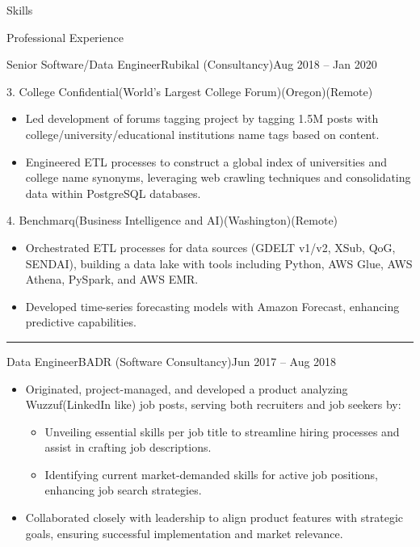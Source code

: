 \documentclass[]{ahmedamrcv}
\begin{document}
\begin{cvsection}{Skills}
\begin{cvsection}{Professional Experience}
\begin{cvsubsection}{Senior Software/Data Engineer}{Rubikal (Consultancy)}{Aug 2018 -- Jan 2020}
		\begin{cvsubsection}{3. College Confidential}{(World's Largest College Forum)}{(Oregon)(Remote)}	
			\begin{itemize}
				\item Led development of forums tagging project by tagging 1.5M posts with college/university/educational institutions name tags based on content.
                    \item Engineered ETL processes to construct a global index of universities and college name synonyms, leveraging web crawling techniques and consolidating data within PostgreSQL databases.
			\end{itemize}
		\end{cvsubsection}

		\begin{cvsubsection}{4. Benchmarq}{(Business Intelligence and AI)}{(Washington)(Remote)}	
			\begin{itemize}
				\item Orchestrated ETL processes for data sources (GDELT v1/v2, XSub, QoG, SENDAI), building a data lake with tools including Python, AWS Glue, AWS Athena, PySpark, and AWS EMR.
				\item Developed time-series forecasting models with Amazon Forecast, enhancing predictive capabilities.
			\end{itemize}
		\end{cvsubsection}
            
            \end{cvsubsection}
            

            \centering\rule{300pt}{0.4pt}

            \begin{cvsubsection}{Data Engineer}{BADR (Software Consultancy)}{Jun 2017 -- Aug 2018}
                \begin{itemize}
                    \item Originated, project-managed, and developed a product analyzing Wuzzuf(LinkedIn like) job posts, serving both recruiters and job seekers by:
                    \begin{itemize}
                        \item Unveiling essential skills per job title to streamline hiring processes and assist in crafting job descriptions.
                        \item Identifying current market-demanded skills for active job positions, enhancing job search strategies.
                    \end{itemize}
                    \item Collaborated closely with leadership to align product features with strategic goals, ensuring successful implementation and market relevance.
                \end{itemize}


\end{cvsubsection}
\end{cvsection}
\end{cvsection}
\end{document}
